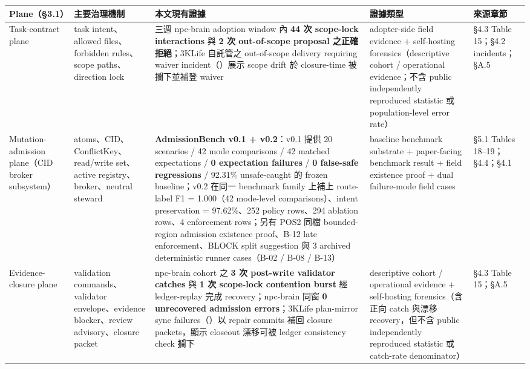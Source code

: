 \documentclass[a4paper,fontset=none]{ctexart}
\begin{document}
\begin{longtable}{L{0.18\textwidth}L{0.18\textwidth}L{0.18\textwidth}L{0.18\textwidth}L{0.18\textwidth}}
\toprule
Plane（§3.1） & 主要治理機制 & 本文現有證據 & 證據類型 & 來源章節 \\
\midrule
Task-contract plane & task intent、allowed files、forbidden rules、scope paths、direction lock & 三週 npc-brain adoption window 內 \textbf{44 次 scope-lock interactions} 與 \textbf{2 次 out-of-scope proposal 之正確拒絕}；3KLife 自託管之 out-of-scope delivery requiring waiver incident（\texttt{}）展示 scope drift 於 closure-time 被攔下並補登 waiver & adopter-side field evidence + self-hosting forensics（descriptive cohort / operational evidence；不含 public independently reproduced statistic 或 population-level error rate） & §4.3 Table 15；§4.2 incidents；§A.5 \\
Mutation-admission plane（CID broker subsystem） & atoms、CID、ConflictKey、read/write set、active registry、broker、neutral steward & \textbf{AdmissionBench v0.1 + v0.2}：v0.1 提供 20 scenarios / 42 mode comparisons / 42 matched expectations / \textbf{0 expectation failures} / \textbf{0 false-safe regressions} / 92.31\% unsafe-caught 的 frozen baseline；v0.2 在同一 benchmark family 上補上 route-label F1 = 1.000（42 mode-level comparisons）、intent preservation = 97.62\%、252 policy rows、294 ablation rows、4 enforcement rows；另有 POS2 同檔 bounded-region admission existence proof、B-12 late enforcement、BLOCK split suggestion 與 3 archived deterministic runner cases（B-02 / B-08 / B-13） & baseline benchmark substrate + paper-facing benchmark result + field existence proof + dual failure-mode field cases & §5.1 Tables 18--19；§4.4；§4.1 \\
Evidence-closure plane & validation commands、validator envelope、evidence blocker、review advisory、closure packet & npc-brain cohort 之 \textbf{3 次 post-write validator catches} 與 \textbf{1 次 scope-lock contention burst} 經 ledger-replay 完成 recovery；npc-brain 同窗 \textbf{0 unrecovered admission errors}；3KLife plan-mirror sync failures（\texttt{}）以 repair commits 補回 closure packets，顯示 closeout 漂移可被 ledger consistency check 攔下 & descriptive cohort / operational evidence + self-hosting forensics（含正向 catch 與漂移 recovery，但不含 public independently reproduced statistic 或 catch-rate denominator） & §4.3 Table 15；§A.5 \\
\bottomrule
\end{longtable}
\endgroup
\end{document}
